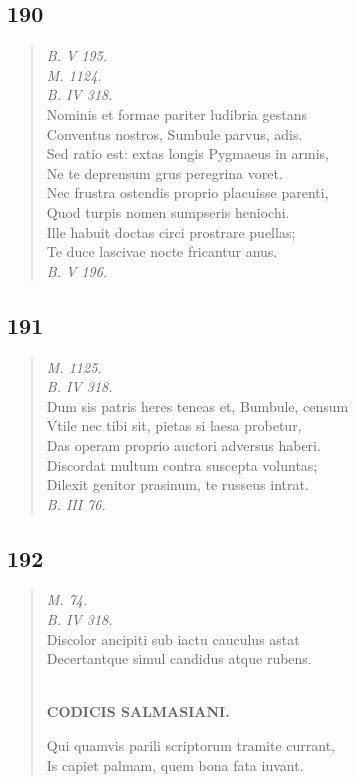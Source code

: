 \documentclass[11pt, a4paper]{report}
\begin{document}
            \subsection*{190}
      \begin{verse}
      \textit{B. V 195.} \\ \textit{M. 1124.} \\ \textit{B. IV 318.} \\ Nominis et formae pariter ludibria gestans \\ Conventus nostros, Sumbule parvus, adis. \\ Sed ratio est: extas longis Pygmaeus in armis, \\ Ne te deprensum grus peregrina voret. \\ Nec frustra ostendis proprio placuisse parenti, \\ Quod turpis nomen sumpseris heniochi. \\ Ille habuit doctas circi prostrare puellas; \\ Te duce lascivae nocte fricantur anus. \\ \textit{B. V 196.} \\ 
      \end{verse}
  
            \subsection*{191}
      \begin{verse}
      \textit{M. 1125.} \\ \textit{B. IV 318.} \\ Dum sis patris heres teneas et, Bumbule, censum \\ Vtile nec tibi sit, pietas si laesa probetur, \\ Das operam proprio auctori adversus haberi. \\ Discordat multum contra suscepta voluntas; \\ Dilexit genitor prasinum, te russeus intrat. \\ \textit{B. III 76.} \\ 
      \end{verse}
  
            \subsection*{192}
      \begin{verse}
      \textit{M. 74.} \\ \textit{B. IV 318.} \\ Discolor ancipiti sub iactu cauculus astat \\ Decertantque simul candidus atque rubens. \\ 
        ﻿\pagebreak 
    \begin{center} \textbf{CODICIS SALMASIANI.} \end{center} \marginpar{[159]} Qui quamvis parili scriptorum tramite currant, \\ Is capiet palmam, quem bona fata iuvant. \\ 
      \end{verse}
  
\end{document}
